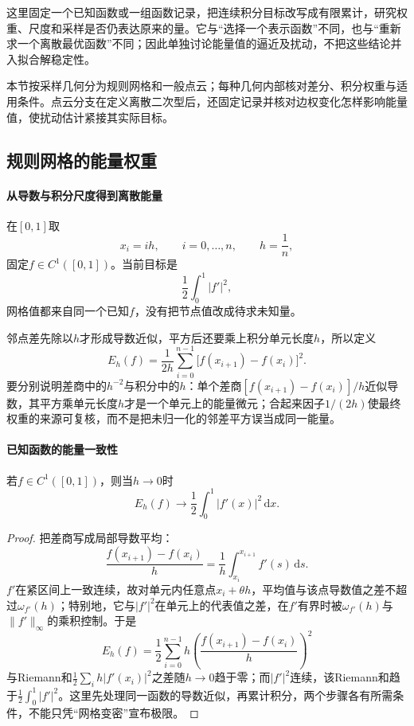 这里固定一个已知函数或一组函数记录，把连续积分目标改写成有限累计，研究权重、尺度和采样是否仍表达原来的量。它与“选择一个表示函数”不同，也与“重新求一个离散最优函数”不同；因此单独讨论能量值的逼近及扰动，不把这些结论并入拟合解稳定性。

本节按采样几何分为规则网格和一般点云；每种几何内部核对差分、积分权重与适用条件。点云分支在定义离散二次型后，还固定记录并核对边权变化怎样影响能量值，使扰动估计紧接其实际目标。

\subsection{规则网格的能量权重}
\label{subsubsec:regular-grid-energy}

\paragraph{从导数与积分尺度得到离散能量}

在$[0,1]$取
\[
  x_i=ih,\qquad i=0,\ldots,n,\qquad h=\frac1n,
\]
固定$f\in C^1([0,1])$。当前目标是
\[
  \frac12\int_0^1|f'|^2,
\]
网格值都来自同一个已知$f$，没有把节点值改成待求未知量。

邻点差先除以$h$才形成导数近似，平方后还要乘上积分单元长度$h$，所以定义
\begin{equation}
  E_h(f)=\frac1{2h}\sum_{i=0}^{n-1}\bigl[f(x_{i+1})-f(x_i)\bigr]^2.
  \label{eq:functional-grid-energy}
\end{equation}
要分别说明差商中的$h^{-2}$与积分中的$h$：单个差商$[f(x_{i+1})-f(x_i)]/h$近似导数，其平方乘单元长度$h$才是一个单元上的能量微元；合起来因子$1/(2h)$使最终权重的来源可复核，而不是把未归一化的邻差平方误当成同一能量。

\paragraph{已知函数的能量一致性}

\begin{theorem}[$E_h$的连续极限]
若$f\in C^1([0,1])$，则当$h\to0$时
\begin{equation}
  E_h(f)\to\frac12\int_0^1|f'(x)|^2\,\mathrm dx.
  \label{eq:functional-grid-energy-convergence}
\end{equation}
\end{theorem}

\begin{proof}
把差商写成局部导数平均：
\[
  \frac{f(x_{i+1})-f(x_i)}h=\frac1h\int_{x_i}^{x_{i+1}}f'(s)\,\mathrm ds.
\]
$f'$在紧区间上一致连续，故对单元内任意点$x_i+\theta h$，平均值与该点导数值之差不超过$\omega_{f'}(h)$；特别地，它与$|f'|^2$在单元上的代表值之差，在$f'$有界时被$\omega_{f'}(h)$与$\|f'\|_\infty$的乘积控制。于是
\[
  E_h(f)=\frac12\sum_{i=0}^{n-1}h\left(\frac{f(x_{i+1})-f(x_i)}h\right)^2
\]
与Riemann和$\frac12\sum_i h|f'(x_i)|^2$之差随$h\to0$趋于零；而$|f'|^2$连续，该Riemann和趋于$\frac12\int_0^1|f'|^2$。这里先处理同一函数的导数近似，再累计积分，两个步骤各有所需条件，不能只凭“网格变密”宣布极限。
\end{proof}

